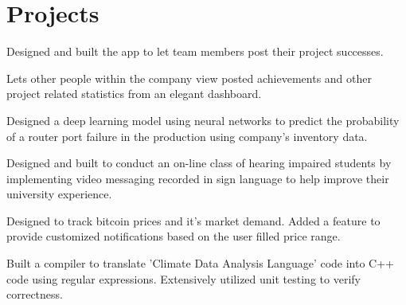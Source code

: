 \documentclass[]{rinkal_resume}
\begin{document}
\begin{minipage}[t]{0.69\textwidth}

\section{Projects}
\begin{tightemize}
\item Designed and built the app to let team members post their project successes.
\item Lets other people within the company view posted achievements and other project related statistics from an elegant dashboard.
\end{tightemize}
\sectionsep

\begin{tightemize}
\item Designed a deep learning model using neural networks to predict the probability of a router port failure in the production using company's inventory data.
\end{tightemize}
\sectionsep

\begin{tightemize}
\item Designed and built to conduct an on-line class of hearing impaired students by implementing video messaging recorded in sign language to help improve their university experience.
\end{tightemize}
\sectionsep

\begin{tightemize}
\item Designed to track bitcoin prices and it's market demand. Added a feature to provide customized notifications based on the user filled price range.
\end{tightemize}
\sectionsep

\begin{tightemize}
\item  Built a compiler to translate 'Climate Data Analysis Language' code into C++ code using regular expressions. Extensively utilized unit testing to verify correctness.
\end{tightemize}
\sectionsep

\end{minipage} 
\end{document}
